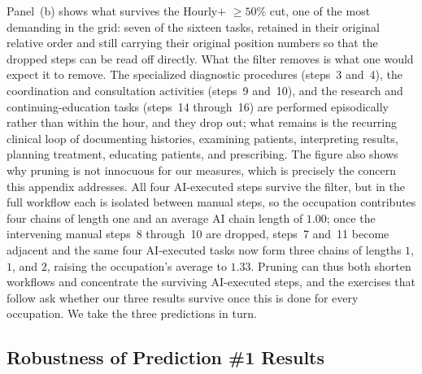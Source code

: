Panel~(b) shows what survives the Hourly$+$ $\geq 50\%$ cut, one of the most demanding in the grid: seven of the sixteen tasks, retained in their original relative order and still carrying their original position numbers so that the dropped steps can be read off directly.
What the filter removes is what one would expect it to remove.
The specialized diagnostic procedures (steps~3 and~4), the coordination and consultation activities (steps~9 and~10), and the research and continuing-education tasks (steps~14 through~16) are performed episodically rather than within the hour, and they drop out; what remains is the recurring clinical loop of documenting histories, examining patients, interpreting results, planning treatment, educating patients, and prescribing.
The figure also shows why pruning is not innocuous for our measures, which is precisely the concern this appendix addresses.
All four AI-executed steps survive the filter, but in the full workflow each is isolated between manual steps, so the occupation contributes four chains of length one and an average AI chain length of $1.00$; once the intervening manual steps~8 through~10 are dropped, steps~7 and~11 become adjacent and the same four AI-executed tasks now form three chains of lengths $1$, $1$, and $2$, raising the occupation's average to $1.33$.
Pruning can thus both shorten workflows and concentrate the surviving AI-executed steps, and the exercises that follow ask whether our three results survive once this is done for every occupation.
We take the three predictions in turn.


\subsection{Robustness of Prediction \#1 Results}
\label{app:frequency_robustness_chains}

